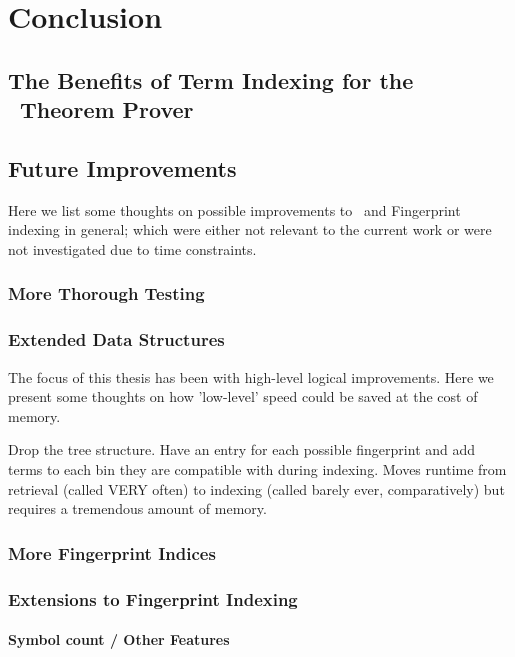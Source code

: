
\chapter{Conclusion}
\label{cha:conclusion}

\section{The Benefits of Term Indexing for the \Beagle\ Theorem Prover }
\label{sec:why}

\section{Future Improvements}
\label{sec:future}

Here we list some thoughts on possible improvements to \beagle\ and Fingerprint
indexing in general; which were either not relevant to the current work or
were not investigated due to time constraints.

\subsection{More Thorough Testing}

\subsection{Extended Data Structures}
The focus of this thesis has been with high-level logical improvements. Here
we present some thoughts on how 'low-level' speed could be saved at the cost of memory.

Drop the tree structure. Have an entry for each possible fingerprint and add terms
to each bin they are compatible with during indexing. Moves runtime from
retrieval (called VERY often) to indexing (called barely ever, comparatively) but requires a
tremendous amount of memory.

\subsection{More Fingerprint Indices}

\subsection{Extensions to Fingerprint Indexing}

\subsubsection{Symbol count / Other Features}
